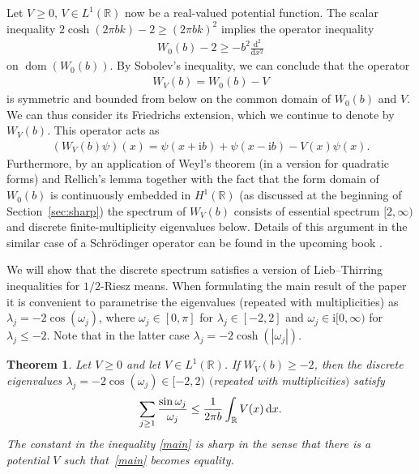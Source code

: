 \documentclass[pdftex]{sigma}%
\numberwithin{equation}{section}
\newtheorem{Theorem}{Theorem}[section]
\newcommand{\ii}{\mathrm{i}}
\newcommand{\R}{\mathbb{R}}
\DeclareMathOperator{\dom}{dom}
\begin{document}
Let $V\ge0$, $V\in L^1(\R)$ now be a real-valued potential function. The scalar inequality $2\cosh(2\pi b k)-2\ge (2\pi b k)^2$ implies the operator inequality
\begin{gather}
W_0(b)-2\ge-b^2\frac{\mathrm{d}^2}{\mathrm{d}x^2}
\label{WH}
\end{gather}
on $\dom(W_0(b))$. By Sobolev's inequality, we can conclude that the operator
\begin{gather*}%
W_V(b)=W_0(b)- V
\end{gather*}
is symmetric and bounded from below on the common domain of $W_0(b)$ and $V$.
We can thus consider its Friedrichs extension, which we continue to denote by $W_V(b)$. This operator acts as
\begin{gather*}
(W_V(b)\psi)(x)=\psi(x+\ii b)+\psi(x-\ii b)-V(x)\psi(x).
\end{gather*}
Furthermore, by an application of Weyl's theorem (in a version for quadratic forms) and Rellich's lemma together with the fact that the form domain of $W_0(b)$ is continuously embedded in $H^1(\R)$ (as discussed at the beginning of Section~\ref{sec:sharp}) the spectrum of $W_V(b)$ consists of essential spectrum $[2,\infty)$ and discrete finite-multiplicity eigenvalues below. Details of this argument in the similar case of a Schr\"odinger operator can be found in the upcoming book \cite[Proposition 4.14]{FLW}.

We will show that the discrete spectrum satisfies a version of Lieb--Thirring inequalities for $1/2$-Riesz means.
When formulating the main result of the paper it is convenient to parametrise the eigenvalues (repeated with multiplicities) as $\lambda_j = - 2\cos(\omega_j)$, where $\omega_j\in [0,\pi]$ for
$\lambda_j\in[-2,2]$ and $\omega_j\in \ii [0,\infty)$ for $\lambda_j\le -2$.
Note that in the latter case $\lambda_j = - 2\cosh(|\omega_j|)$.

\begin{Theorem}\label{1}
Let $V\ge 0$ and let $V\in L^1(\mathbb R)$. If $W_V(b)\ge-2$, then
the discrete eigenvalues $\lambda_j=-2\cos(\omega_j)\in [-2,2)$ $($repeated with multiplicities$)$ satisfy
\begin{gather}\label{main}
\sum_{j\ge1}\frac{\sin\omega_j}{\omega_j}\le \frac{1}{2\pi b}\int_{\R}V(x) \, {\rm d} x.
\end{gather}
The constant in the inequality \eqref{main} is sharp in the sense that there is a potential
$V$ such that~\eqref{main} becomes equality.
\end{Theorem}
\end{document}
